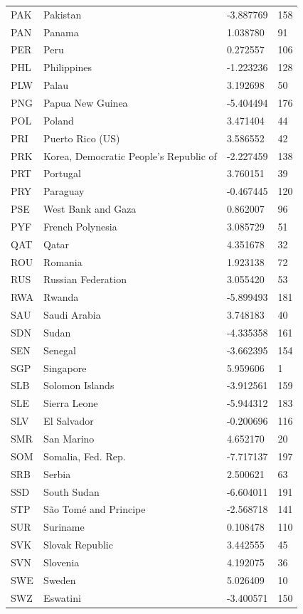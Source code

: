 \begin{tabular}{llll}
PAK & Pakistan & -3.887769 & 158 \\
PAN & Panama & 1.038780 & 91 \\
PER & Peru & 0.272557 & 106 \\
PHL & Philippines & -1.223236 & 128 \\
PLW & Palau & 3.192698 & 50 \\
PNG & Papua New Guinea & -5.404494 & 176 \\
POL & Poland & 3.471404 & 44 \\
PRI & Puerto Rico (US) & 3.586552 & 42 \\
PRK & Korea, Democratic People’s Republic of & -2.227459 & 138 \\
PRT & Portugal & 3.760151 & 39 \\
PRY & Paraguay & -0.467445 & 120 \\
PSE & West Bank and Gaza & 0.862007 & 96 \\
PYF & French Polynesia & 3.085729 & 51 \\
QAT & Qatar & 4.351678 & 32 \\
ROU & Romania & 1.923138 & 72 \\
RUS & Russian Federation & 3.055420 & 53 \\
RWA & Rwanda & -5.899493 & 181 \\
SAU & Saudi Arabia & 3.748183 & 40 \\
SDN & Sudan & -4.335358 & 161 \\
SEN & Senegal & -3.662395 & 154 \\
SGP & Singapore & 5.959606 & 1 \\
SLB & Solomon Islands & -3.912561 & 159 \\
SLE & Sierra Leone & -5.944312 & 183 \\
SLV & El Salvador & -0.200696 & 116 \\
SMR & San Marino & 4.652170 & 20 \\
SOM & Somalia, Fed. Rep. & -7.717137 & 197 \\
SRB & Serbia & 2.500621 & 63 \\
SSD & South Sudan & -6.604011 & 191 \\
STP & São Tomé and Principe & -2.568718 & 141 \\
SUR & Suriname & 0.108478 & 110 \\
SVK & Slovak Republic & 3.442555 & 45 \\
SVN & Slovenia & 4.192075 & 36 \\
SWE & Sweden & 5.026409 & 10 \\
SWZ & Eswatini & -3.400571 & 150 \\

\end{tabular}
